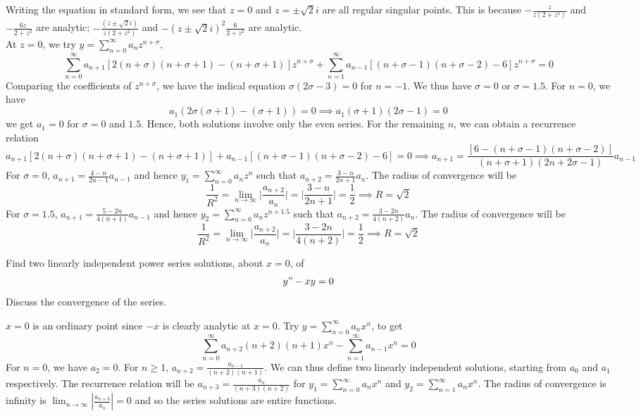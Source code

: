 \documentclass[a4paper]{article}
\begin{document}
\begin{ans}
Writing the equation in standard form, we see that $z=0$ and $z=\pm\sqrt{2}i$ are all regular singular points. This is because $-\frac{z}{z(2+z^2)}$ and $-\frac{6z}{2+z^2}$ are analytic; $-\frac{(z\pm\sqrt{2}i)}{z(2+z^2)}$ and $-(z\pm\sqrt{2}i)^2\frac{6}{2+z^2}$ are analytic.\\[5pt]
At $z=0$, we try $y=\sum_{n=0}^\infty a_nz^{n+\sigma}$,
$$\sum_{n=0}^\infty a_{n+1}[2(n+\sigma)(n+\sigma+1)-(n+\sigma+1)]z^{n+\sigma}+\sum_{n=1}^\infty a_{n-1}[(n+\sigma-1)(n+\sigma-2)-6]z^{n+\sigma}=0$$
Comparing the coefficients of $z^{n+\sigma}$, we have the indical equation $\sigma(2\sigma-3)=0$ for $n=-1$. We thus have $\sigma=0$ or $\sigma=1.5$. For $n=0$, we have
$$a_1(2\sigma(\sigma+1)-(\sigma+1))=0\implies a_1(\sigma+1)(2\sigma-1)=0$$
we get $a_1=0$ for $\sigma=0$ and $1.5$. Hence, both solutions involve only the even series. For the remaining $n$, we can obtain a recurrence relation
$$a_{n+1}[2(n+\sigma)(n+\sigma+1)-(n+\sigma+1)]+a_{n-1}[(n+\sigma-1)(n+\sigma-2)-6]=0\implies a_{n+1}=\frac{[6-(n+\sigma-1)(n+\sigma-2)]}{(n+\sigma+1)(2n+2\sigma-1)}a_{n-1}$$
For $\sigma=0$, $a_{n+1}=\frac{4-n}{2n-1}a_{n-1}$ and hence $y_1=\sum_{n=0}^\infty a_nz^n$ such that $a_{n+2}=\frac{3-n}{2n+1}a_n$. The radius of convergence will be
$$\frac{1}{R^2}=\lim_{n\rightarrow\infty}\bigg|\frac{a_{n+2}}{a_n}\bigg|=\bigg|\frac{3-n}{2n+1}\bigg|=\frac{1}{2}\implies R=\sqrt{2}$$
For $\sigma=1.5$, $a_{n+1}=\frac{5-2n}{4(n+1)}a_{n-1}$ and hence $y_2=\sum_{n=0}^\infty a_nz^{n+1.5}$ such that $a_{n+2}=\frac{3-2n}{4(n+2)}a_n$. The radius of convergence will be
$$\frac{1}{R^2}=\lim_{n\rightarrow\infty}\bigg|\frac{a_{n+2}}{a_n}\bigg|=\bigg|\frac{3-2n}{4(n+2)}\bigg|=\frac{1}{2}\implies R=\sqrt{2}$$
\end{ans}
\begin{qns}
Find two linearly independent power series solutions, about $x = 0$, of
$$y"-xy=0$$
Discuss the convergence of the series.
\end{qns}
\begin{ans}
$x=0$ is an ordinary point since $-x$ is clearly analytic at $x=0$. Try $y=\sum_{n=0}^\infty a_nx^n$, to get
$$\sum_{n=0}^\infty a_{n+2}(n+2)(n+1)x^n-\sum_{n=1}^\infty a_{n-1}x^n=0$$
For $n=0$, we have $a_2=0$. For $n\geq 1$, $a_{n+2}=\frac{a_{n-1}}{(n+2)(n+1)}$. We can thus define two linearly independent solutions, starting from $a_0$ and $a_1$ respectively. The recurrence relation will be $a_{n+3}=\frac{a_n}{(n+3)(n+2)}$ for $y_1=\sum_{n=0}^\infty a_nx^n$ and $y_2=\sum_{n=1}^\infty a_nx^n$. The radius of convergence is infinity is $\lim_{n\rightarrow\infty}|\frac{a_{n+3}}{a_n}|=0$ and so the series solutions are entire functions.
\end{ans}
\end{document}
